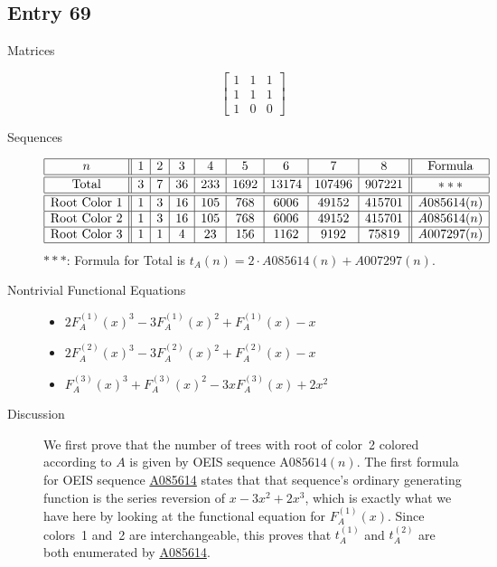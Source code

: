 \documentclass[12pt]{amsart}
\newcommand{\seqnum}[1]{\href{https://oeis.org/#1}{#1}}
\newcommand{\gff}[2]{F_{#2}^{(#1)}(x)}
\newcommand{\gfa}[1]{\gff{#1}{A}}
\begin{document}
\subsection*{Entry 69}
\begin{description}
    \item[Matrices]
    
    \[\begin{bmatrix}
1 & 1 & 1 \\
1 & 1 & 1 \\
1 & 0 & 0
\end{bmatrix}\]
    \item[Sequences]\hspace*{\fill}\vspace{-0.5cm}
    \begin{center}
        \[
        \begin{array}{|c||c|c|c|c|c|c|c|c||c|}\hline
           n  & 1 & 2 & 3 & 4 & 5 & 6 & 7 & 8  & \text{Formula}\\\hline\hline
           \text{Total}  & 3 & 7 & 36 & 233 & 1692 & 13174 & 107496 & 907221 & ***\\\hline\hline
           \text{Root Color }1 & 1 & 3 & 16 & 105 & 768 & 6006 & 49152 & 415701 & A085614(n)\\\hline
           \text{Root Color }2 & 1 & 3 & 16 & 105 & 768 & 6006 & 49152 & 415701 & A085614(n)\\\hline
           \text{Root Color }3 & 1 & 1 & 4 & 23 & 156 & 1162 & 9192 & 75819 & A007297(n)\\\hline
        \end{array}
        \]
        $***$: Formula for Total is $t_A(n)=2\cdot A085614(n) + A007297(n)$.
    \end{center}
    
    \item[Nontrivial Functional Equations]\hspace*{\fill}

    \begin{itemize}
\item $2\gfa{1}^3-3\gfa{1}^2+\gfa{1}-x$


\item $2\gfa{2}^3-3\gfa{2}^2+\gfa{2}-x$


\item $\gfa{3}^3+\gfa{3}^2-3x\gfa{3}+2x^2$


\end{itemize}
    \item[Discussion]
    We first prove that the number of trees with root of color~2 colored according to $A$ is given by OEIS sequence $\text{A085614}(n)$.
    The first formula for OEIS sequence \seqnum{A085614} states that that sequence's ordinary generating function is the series reversion of $x-3x^2+2x^3$, which is exactly what we have here by looking at the functional equation for $\gfa{1}$. 
    Since colors~1 and~2 are interchangeable, this proves that $t_A^{(1)}$ and $t_A^{(2)}$ are both enumerated by \seqnum{A085614}.


\end{description}
\end{document}
